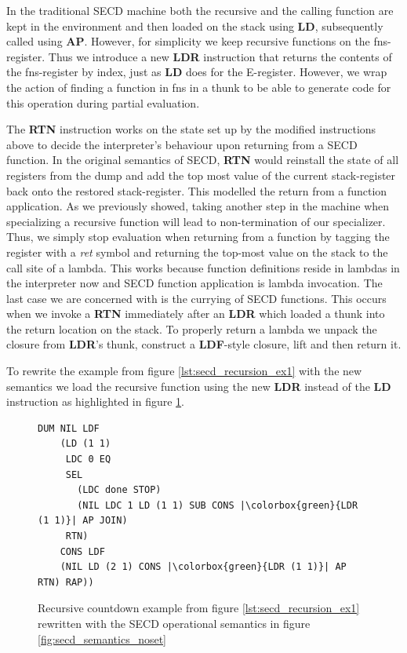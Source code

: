 \documentclass[a4paper,12pt,twoside,openright]{report}
\theoremstyle{definition}
\newcommand{\ts}{\textquotesingle}
\begin{document}
In the traditional SECD machine both the recursive and the calling function are kept in the environment and then loaded on the stack using \textbf{LD}, subsequently called using \textbf{AP}. However, for simplicity we keep recursive functions on the fns-register. Thus we introduce a new \textbf{LDR} instruction that returns the contents of the fns-register by index, just as \textbf{LD} does for the E-register. However, we wrap the action of finding a function in fns in a thunk to be able to generate code for this operation during partial evaluation.

The \textbf{RTN} instruction works on the state set up by the modified instructions above to decide the interpreter's behaviour upon returning from a SECD function. In the original semantics of SECD, \textbf{RTN} would reinstall the state of all registers from the dump and add the top most value of the current stack-register back onto the restored stack-register. This modelled the return from a function application. As we previously showed, taking another step in the machine when specializing a recursive function will lead to non-termination of our specializer. Thus, we simply stop evaluation when returning from a function by tagging the register with a \textit{{\ts}ret} symbol and returning the top-most value on the stack to the call site of a lambda. This works because function definitions reside in lambdas in the interpreter now and SECD function application is lambda invocation. The last case we are concerned with is the currying of SECD functions. This occurs when we invoke a \textbf{RTN} immediately after an \textbf{LDR} which loaded a thunk into the return location on the stack. To properly return a lambda we unpack the closure from \textbf{LDR}'s thunk, construct a \textbf{LDF}-style closure, lift and then return it.


To rewrite the example from figure \ref{lst:secd_recursion_ex1} with the new semantics we load the recursive function using the new \textbf{LDR} instead of the \textbf{LD} instruction as highlighted in figure \ref{lst:secd_recursion_ex1_newsem}.

\begin{figure}[ht]
\begin{verbatim}
DUM NIL LDF
    (LD (1 1)
     LDC 0 EQ
     SEL
       (LDC done STOP)
       (NIL LDC 1 LD (1 1) SUB CONS |\colorbox{green}{LDR (1 1)}| AP JOIN)
     RTN)
    CONS LDF
    (NIL LD (2 1) CONS |\colorbox{green}{LDR (1 1)}| AP RTN) RAP))
\end{verbatim}
\caption{Recursive countdown example from figure \ref{lst:secd_recursion_ex1} rewritten with the SECD operational semantics in figure \ref{fig:secd_semantics_noset}}
\label{lst:secd_recursion_ex1_newsem}
\end{figure}
\end{document}
